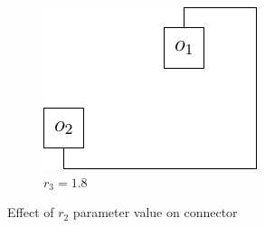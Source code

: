 \documentclass[a4paper,12pt]{report}
\begin{document}
\begin{figure}
\begin{subfigure}{.33\textwidth}
    \centering
    \includegraphics[width=0.9\linewidth]{connectorExample_r3_1_8.pdf}
    \caption{$r_3=1.8$}
  \end{subfigure}

  \caption{Effect of $r_2$ parameter value on connector}
  \label{r3_connectorExample}
\end{figure}
\end{document}
